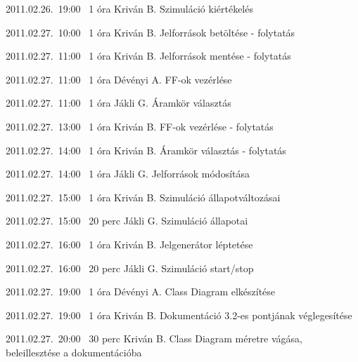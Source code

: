 \begin{naplo}
\bejegyzes
{2011.02.26.~19:00~} %
{1 óra} %
{Kriván B.} %
{Szimuláció kiértékelés} %

\bejegyzes
{2011.02.27.~10:00~} %
{1 óra} %
{Kriván B.} %
{Jelforrások betöltése - folytatás} %

\bejegyzes
{2011.02.27.~11:00~} %
{1 óra} %
{Kriván B.} %
{Jelforrások mentése - folytatás} %

\bejegyzes
{2011.02.27.~11:00~} %
{1 óra} %
{Dévényi A.} %
{FF-ok vezérlése} %

\bejegyzes
{2011.02.27.~11:00~} %
{1 óra} %
{Jákli G.} %
{Áramkör választás} %

\bejegyzes
{2011.02.27.~13:00~} %
{1 óra} %
{Kriván B.} %
{FF-ok vezérlése - folytatás} %

\bejegyzes
{2011.02.27.~14:00~} %
{1 óra} %
{Kriván B.} %
{Áramkör választás - folytatás} %

\bejegyzes
{2011.02.27.~14:00~} %
{1 óra} %
{Jákli G.} %
{Jelforrások módosítása} %

\bejegyzes
{2011.02.27.~15:00~} %
{1 óra} %
{Kriván B.} %
{Szimuláció állapotváltozásai} %

\bejegyzes
{2011.02.27.~15:00~} %
{20 perc} %
{Jákli G.} %
{Szimuláció állapotai} %

\bejegyzes
{2011.02.27.~16:00~} %
{1 óra} %
{Kriván B.} %
{Jelgenerátor léptetése} %

\bejegyzes
{2011.02.27.~16:00~} %
{20 perc} %
{Jákli G.} %
{Szimuláció start/stop} %

\bejegyzes
{2011.02.27.~19:00~} %
{1 óra} %
{Dévényi A.} %
{Class Diagram elkészítése} %

\bejegyzes
{2011.02.27.~19:00~} %
{1 óra} %
{Kriván B.} %
{Dokumentáció 3.2-es pontjának véglegesítése} %

\bejegyzes
{2011.02.27.~20:00~} %
{30 perc} %
{Kriván B.} %
{Class Diagram méretre vágása, beleillesztése a dokumentációba} %

\end{naplo}

